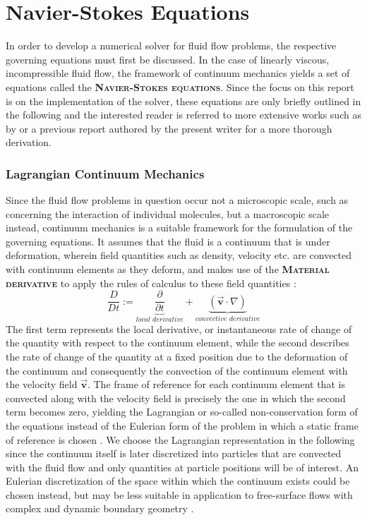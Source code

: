 \documentclass[oneside, a4paper]{book}
\newcommand\emphasis[1]{{\scshape\bfseries#1}}
\newcommand\vek[1]{\vec{\bm{#1}}}
\newcommand\br[1]{\left(#1\right)}
\begin{document}
    \section{Navier-Stokes Equations}\label{sec:navier-stokes}
    In order to develop a numerical solver for fluid flow problems, the respective governing equations must first be discussed. In the case of linearly viscous, incompressible fluid flow, the framework of continuum mechanics yields a set of equations called the \emphasis{Navier-Stokes equations}. Since the focus on this report is on the implementation of the solver, these equations are only briefly outlined in the following and the interested reader is referred to more extensive works such as by \cite[Anderson]{anderson} or a previous report authored by the present writer \autocite{labcourse} for a more thorough derivation.

    \subsubsection{Lagrangian Continuum Mechanics}
    Since the fluid flow problems in question occur not a microscopic scale, such as concerning the interaction of individual molecules, but a macroscopic scale instead, continuum mechanics is a suitable framework for the formulation of the governing equations. It assumes that the fluid is a continuum that is under deformation, wherein field quantities such as density, velocity etc. are convected with continuum elements as they deform, and makes use of the \emphasis{Material derivative} to apply the rules of calculus to these field quantities \autocite{anderson}:
      \begin{equation}
        \frac{D}{Dt} := \underbrace{\frac{\partial}{\partial t}}_{\textit{local derivative}} + \underbrace{\br{\vek{v}\cdot \nabla}}_{\textit{convective derivative}}
      \end{equation}
    The first term represents the local derivative, or instantaneous rate of change of the quantity with respect to the continuum element, while the second describes the rate of change of the quantity at a fixed position due to the deformation of the continuum and consequently the convection of the continuum element with the velocity field $\vek{v}$. The frame of reference for each continuum element that is convected along with the velocity field is precisely the one in which the second term becomes zero, yielding the Lagrangian or so-called non-conservation form of the equations instead of the Eulerian form of the problem in which a static frame of reference is chosen \autocite{anderson}. We choose the Lagrangian representation in the following since the continuum itself is later discretized into particles that are convected with the fluid flow and only quantities at particle positions will be of interest. An Eulerian discretization of the space within which the continuum exists could be chosen instead, but may be less suitable in application to free-surface flows with complex and dynamic boundary geometry \autocite{tutorial2019}.
\end{document}
